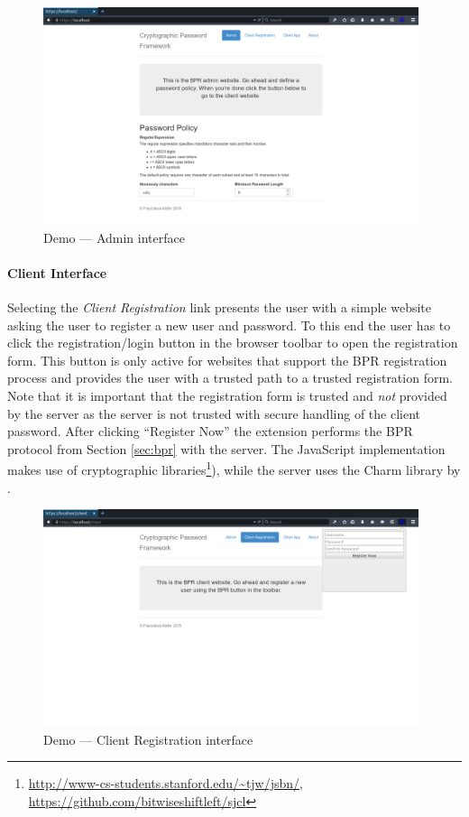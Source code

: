 \begin{figure}[tbph]
\centering
\includegraphics[width=0.98\textwidth]{Figs/demo-admin.png}
\caption{Demo --- Admin interface}\label{fig:demo-admin}
\end{figure}

\paragraph{Client Interface}
Selecting the \emph{Client Registration} link presents the user with a simple website asking the user to register a new user and password.
To this end the user has to click the registration/login button in the browser toolbar to open the registration form.
This button is only active for websites that support the \ac{BPR} registration process and provides the user with a trusted path to a trusted registration form.
Note that it is important that the registration form is trusted and \emph{not} provided by the server as the server is not trusted with secure handling of the client password.
After clicking ``Register Now'' the extension performs the \ac{BPR} protocol from Section \ref{sec:bpr} with the server.
The JavaScript implementation makes use of cryptographic libraries\footnote{\url{http://www-cs-students.stanford.edu/~tjw/jsbn/},\\\hspace*{1.5em} \url{https://github.com/bitwiseshiftleft/sjcl}}), while the server uses the Charm library by \citet{charm13}.

\begin{figure}[tbph]
\centering
\includegraphics[width=0.98\textwidth]{Figs/demo-register-popup.png}
\caption{Demo --- Client Registration interface}\label{fig:demo-register}
\end{figure}

